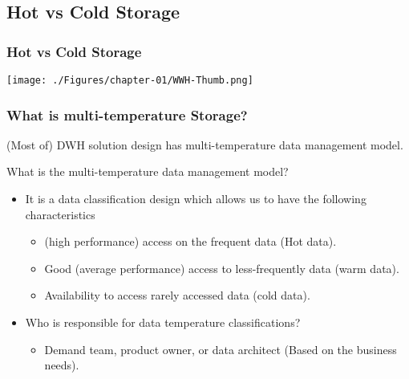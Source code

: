 
\VideoClassification[column=2, colour=red]

\subsection{Hot vs Cold Storage}
\begin{frame}[c]
\frametitle{Hot vs Cold Storage}

\texttt{[image: ./Figures/chapter-01/WWH-Thumb.png]}



\end{frame}


\begin{frame}
\frametitle{What is multi-temperature Storage?}

\begin{wideitemize}
\item (Most of) DWH solution design has multi-temperature data management model.
\item What is the multi-temperature data management model?
\begin{itemize}[<+->]
	\item It is a data classification design which allows us to have the following characteristics
	\begin{itemize}[<+->]
		\item  (high performance) access on the frequent data (Hot data).
		\item Good (average performance) access to less-frequently data (warm data).
		\item Availability to access rarely accessed data (cold data).
	\end{itemize}
	\item Who is responsible for data temperature classifications?
	\begin{itemize}[<+->]
		\item Demand team, product owner, or data architect (Based on the business needs).
	\end{itemize}
\end{itemize}
\end{wideitemize}
\end{frame}


